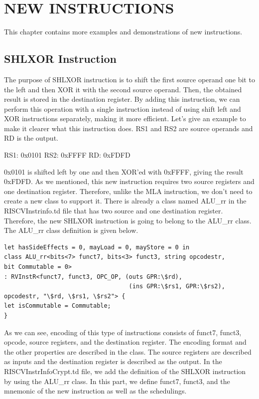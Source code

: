\clearpage
\chapter{NEW INSTRUCTIONS}\label{Ch9}
This chapter contains more examples and demonstrations of new instructions.

\section{SHLXOR Instruction}
The purpose of SHLXOR instruction is to shift the first source operand one bit to the left and then XOR it with the second source operand. Then, the obtained result is stored in the destination register. By adding this instruction, we can perform this operation with a single instruction instead of using shift left and XOR instructions separately, making it more efficient.
Let’s give an example to make it clearer what this instruction does. RS1 and RS2 are source operands and RD is the output.
\par
RS1: 0x0101     RS2: 0xFFFF     RD: 0xFDFD
\par
0x0101 is shifted left by one and then XOR’ed with 0xFFFF, giving the result 0xFDFD.
As we mentioned, this new instruction requires two source registers and one destination register. Therefore, unlike the MLA instruction, we don’t need to create a new class to support it. There is already a class named ALU\_rr in the RISCVInstrinfo.td file that has two source and one destination register. Therefore, the new SHLXOR instruction is going to belong to the ALU\_rr class. The ALU\_rr class definition is given below.

\begin{lstlisting}
let hasSideEffects = 0, mayLoad = 0, mayStore = 0 in
class ALU_rr<bits<7> funct7, bits<3> funct3, string opcodestr,
bit Commutable = 0>
: RVInstR<funct7, funct3, OPC_OP, (outs GPR:\$rd),
                                   (ins GPR:\$rs1, GPR:\$rs2),
opcodestr, "\$rd, \$rs1, \$rs2"> {
let isCommutable = Commutable;
}
\end{lstlisting}

As we can see, encoding of this type of instructions consists of funct7, funct3, opcode, source registers, and the destination register. The encoding format and the other properties are described in the class. The source registers are described as inputs and the destination register is described as the output.
In the RISCVInstrInfoCrypt.td file, we add the definition of the SHLXOR instruction by using the ALU\_rr class. In this part, we define funct7, funct3, and the mnemonic of the new instruction as well as the schedulings.


